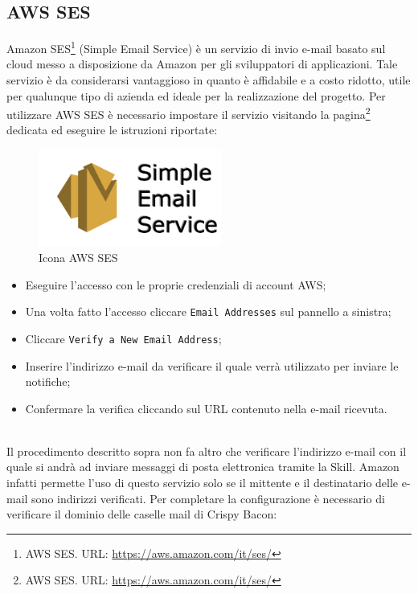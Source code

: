 \subsection{AWS SES}
Amazon SES\footnote{AWS SES. URL: \href{https://aws.amazon.com/it/ses/}{https://aws.amazon.com/it/ses/}} (Simple Email Service) è un servizio di invio e-mail basato sul cloud messo a disposizione da Amazon per gli sviluppatori di applicazioni. Tale servizio è da considerarsi vantaggioso in quanto è affidabile e a costo ridotto, utile per qualunque tipo di azienda ed ideale per la realizzazione del progetto.
\newpage
\noindent Per utilizzare AWS SES è necessario impostare il servizio visitando la pagina\footnote{AWS SES. URL: \href{https://aws.amazon.com/it/ses/}{https://aws.amazon.com/it/ses/}} dedicata ed eseguire le istruzioni riportate:
\\[0.5cm]
\begin{minipage}{0.5\textwidth}
	\begin{figure}[H]
		\includegraphics[width=6cm]{immagini/ses.png}
		\caption{\label{fig:icona_aws_ses}Icona AWS SES}
	\end{figure}
\end{minipage}
\begin{minipage}{0.5\textwidth}
	\begin{itemize}
		\item Eseguire l'accesso con le proprie credenziali di account AWS;
    	\item Una volta fatto l'accesso cliccare \texttt{Email Addresses} sul pannello a sinistra;
    	\item Cliccare \texttt{Verify a New Email Address};
    	\item Inserire l'indirizzo e-mail da verificare il quale verrà utilizzato per inviare le notifiche;
    	\item Confermare la verifica cliccando sul URL contenuto nella e-mail ricevuta.
	\end{itemize}
\end{minipage}
\\[0.5cm]
Il procedimento descritto sopra non fa altro che verificare l'indirizzo e-mail con il quale si andrà ad inviare messaggi di posta elettronica tramite la Skill. Amazon infatti permette l'uso di questo servizio solo se il mittente e il destinatario delle e-mail sono indirizzi verificati. Per completare la configurazione è necessario di verificare il dominio delle caselle mail di Crispy Bacon: 
